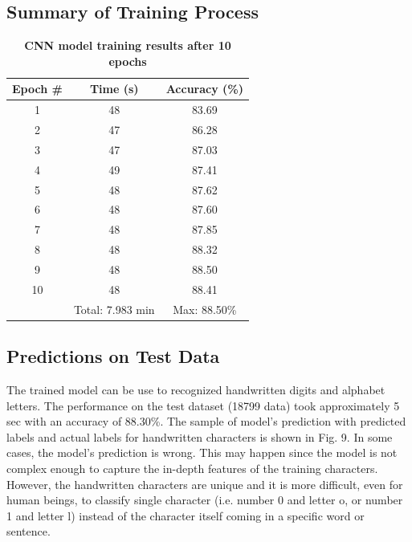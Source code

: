 \documentclass[conference]{IEEEtran}
\begin{document}
\subsection{Summary of Training Process}

\begin{table}[h!]
\begin{center}
\begin{tabular}{||c c c ||} 
 \hline
 Epoch \# & Time (s) & Accuracy (\%)\\ [0.5ex] 
 \hline\hline
 1 & 48 & 83.69 \\ 
 \hline
 2 & 47 & 86.28  \\
 \hline
 3 & 47 & 87.03 \\
 \hline
 4 & 49 & 87.41  \\
 \hline
 5 & 48 & 87.62  \\
  \hline
 6 & 48 & 87.60  \\
  \hline
 7 & 48 & 87.85  \\
  \hline
 8 & 48 & 88.32  \\
  \hline
 9 & 48 & 88.50  \\
 	\hline
 10 & 48 & 88.41  \\
 	\hline
  & Total: 7.983 min & Max: 88.50\%  \\[1ex] 
 \hline
\end{tabular}
\caption{\label{t2} \textbf{CNN model training results after 10 epochs} }
\end{center}
\end{table}

\subsection{Predictions on Test Data}

The trained model can be use to recognized handwritten digits and alphabet letters. The performance on the test dataset (18799 data) took approximately 5 sec with an accuracy of 88.30\%. The sample of model's prediction with predicted labels and actual labels for handwritten characters is shown in Fig. 9. In some cases, the model's prediction is wrong. This may happen since the model is not complex enough to capture the in-depth features of the training characters. However, the handwritten characters are unique and it is more difficult, even for human beings, to classify single character (i.e. number 0 and letter o, or number 1 and letter l) instead of the character itself coming in a specific word or sentence.
\end{document}
